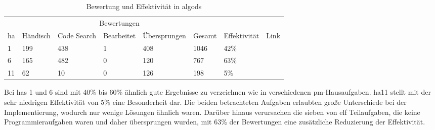 \renewcommand{\thefootnote}{\alph{footnote}}
\begin{table}
    \centering
    \caption{Bewertung und Effektivität in \ac{algods}}
    \begin{tabular}{|l|l|l|l|l|l|l|l|}
    \hline
        ~ & \multicolumn{5}{c|}{Bewertungen} & ~ & ~ \\
        \acs{ha} & Händisch & Code Search & Bearbeitet & Übersprungen & Gesamt & Effektivität & Link \\ \hline
        1  & 199 & 438 & 1 & 408 & 1046 & 42\% & \footnotemark[1] \\ \hline
        6  & 165 & 482 & 0 & 120 &  767 & 63\% & \footnotemark[2] \\ \hline
        11 &  62 &  10 & 0 & 126 &  198 & 5\% & \footnotemark[3] \\ \hline
    \end{tabular}
    \label{tbl:algods-effectiveness}
\end{table}

\renewcommand{\thefootnote}{\arabic{footnote}}

Bei \acp{ha} 1 und 6 sind mit 40\% bis 60\% ähnlich gute Ergebnisse zu verzeichnen wie in verschiedenen \ac{pm}-Hausaufgaben.
\ac{ha}11 stellt mit der sehr niedrigen Effektivität von 5\% eine Besonderheit dar.
Die beiden betrachteten Aufgaben erlaubten große Unterschiede bei der Implementierung, wodurch nur wenige Lösungen ähnlich waren.
Darüber hinaus verursachen die sieben von elf Teilaufgaben, die keine Programmieraufgaben waren und daher übersprungen wurden, mit 63\% der Bewertungen eine zusätzliche Reduzierung der Effektivität.
